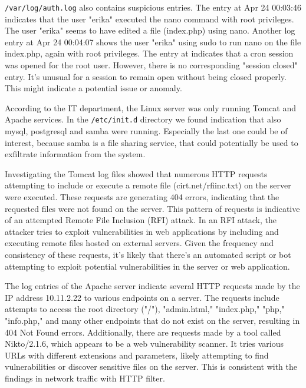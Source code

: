 \noindent\texttt{/var/log/auth.log} also contains suspicious entries. The entry at Apr 24 00:03:46 indicates that the user "erika" executed the nano command with root privileges. The user "erika" seems to have edited a file (index.php) using nano. Another log entry at Apr 24 00:04:07 shows the user "erika" using sudo to run nano on the file index.php, again with root privileges. The entry at indicates that a cron session was opened for the root user. However, there is no corresponding "session closed" entry. It's unusual for a session to remain open without being closed properly. This might indicate a potential issue or anomaly.
\newline

\noindent According to the IT department, the Linux server was only running Tomcat and Apache services. In the \texttt{/etc/init.d} directory we found indication that also mysql, postgresql and samba were running. Especially the last one could be of interest, because samba is a file sharing service, that could potentially be used to exfiltrate information from the system.
\newline

\noindent
Investigating the Tomcat log files showed that numerous HTTP requests attempting to include or execute a remote file (cirt.net/rfiinc.txt) on the server were executed. These requests are generating 404 errors, indicating that the requested files were not found on the server. This pattern of requests is indicative of an attempted Remote File Inclusion (RFI) attack. In an RFI attack, the attacker tries to exploit vulnerabilities in web applications by including and executing remote files hosted on external servers. Given the frequency and consistency of these requests, it's likely that there's an automated script or bot attempting to exploit potential vulnerabilities in the server or web application.
\newline

\noindent The log entries of the Apache server indicate several HTTP requests made by the IP address 10.11.2.22 to various endpoints on a server. The requests include attempts to access the root directory ("/"), "admin.html," "index.php," "php," "info.php," and many other endpoints that do not exist on the server, resulting in 404 Not Found errors. Additionally, there are requests made by a tool called Nikto/2.1.6, which appears to be a web vulnerability scanner. It tries various URLs with different extensions and parameters, likely attempting to find vulnerabilities or discover sensitive files on the server. This is consistent with the findings in network traffic with HTTP filter.

